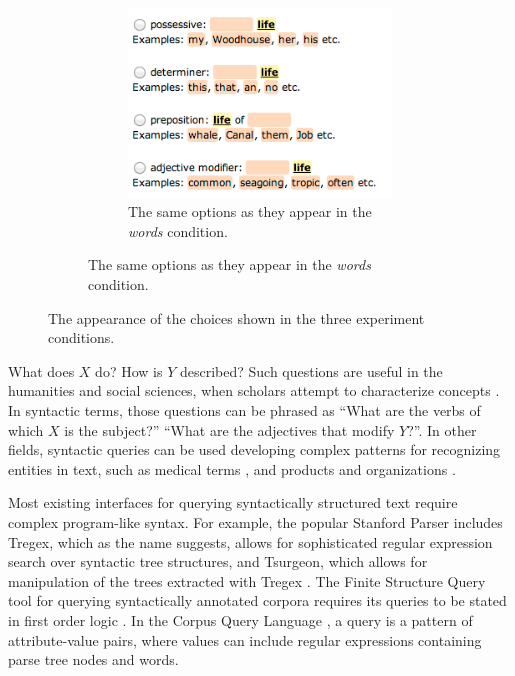 \begin{figure}[th]
\begin{subfigure}{0.7\columnwidth}
	    \begin{subfigure}{0.7\columnwidth}
	    	\centering
	    	\includegraphics[width=0.9\columnwidth]{fig/words-choices}
	        \caption {The same options as they appear in the \emph{words} condition. \label{fig:words-choices}}
	    \end{subfigure}
	\end{subfigure}
\caption{\label{fig:choices} The appearance of the choices shown in the three experiment conditions.}
\end{figure}


What does $X$ do? How is $Y$ described? Such questions are useful in the humanities and social sciences, when scholars attempt to characterize concepts \cite{muralidharan2013supporting}. In syntactic terms, those questions can be phrased as ``What are the verbs of which $X$ is the subject?'' ``What are the adjectives that modify $Y$?''. In other fields, syntactic queries can be used  developing complex patterns for recognizing entities in text, such as medical terms \cite{hirschman2005overview,maclean2013identifying}, and  products and organizations \cite{culotta2005reducing}.

Most existing interfaces for querying syntactically structured text require complex program-like syntax. For example, the popular Stanford Parser includes Tregex, which as the name suggests,  allows for sophisticated regular expression search over syntactic tree structures, and Tsurgeon, which allows for manipulation of the trees extracted with Tregex \cite{levy2006tregex}. The Finite Structure Query tool for querying syntactically annotated corpora requires its queries to be stated in first order logic \cite{kepser2003finite}. In the Corpus Query Language \cite{jakubicek2010fast}, a query is a pattern of attribute-value pairs, where values can include regular expressions containing parse tree nodes and words.

